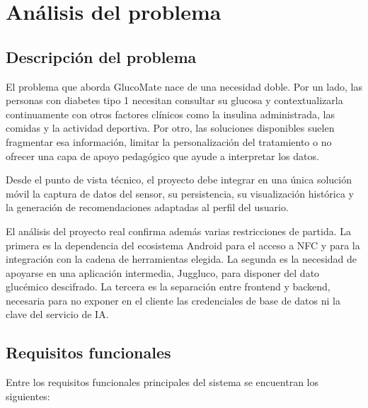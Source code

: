 \chapter{Análisis del problema}\label{cap:analisis}

\section{Descripción del problema}

El problema que aborda GlucoMate nace de una necesidad doble. Por un lado, las personas
con diabetes tipo 1 necesitan consultar su glucosa y contextualizarla continuamente con
otros factores clínicos como la insulina administrada, las comidas y la actividad
deportiva. Por otro, las soluciones disponibles suelen fragmentar esa información,
limitar la personalización del tratamiento o no ofrecer una capa de apoyo pedagógico que
ayude a interpretar los datos.

Desde el punto de vista técnico, el proyecto debe integrar en una única solución móvil la
captura de datos del sensor, su persistencia, su visualización histórica y la generación
de recomendaciones adaptadas al perfil del usuario.

El análisis del proyecto real confirma además varias restricciones de partida. La primera
es la dependencia del ecosistema Android para el acceso a NFC y para la integración con la
cadena de herramientas elegida. La segunda es la necesidad de apoyarse en una aplicación
intermedia, Juggluco, para disponer del dato glucémico descifrado. La tercera es la
separación entre frontend y backend, necesaria para no exponer en el cliente las
credenciales de base de datos ni la clave del servicio de IA.

\section{Requisitos funcionales}

Entre los requisitos funcionales principales del sistema se encuentran los siguientes:

